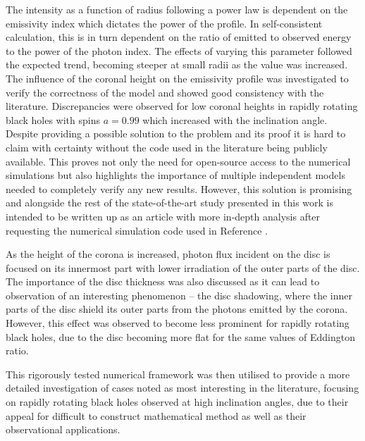 \documentclass[fleqn,usenatbib,useAMS]{mnras}
\begin{document}
The intensity as a function of radius following a power law is dependent on the emissivity index which dictates the power of the profile. In self-consistent calculation, this is in turn dependent on the ratio of emitted to observed energy to the power of the photon index. The effects of varying this parameter followed the expected trend, becoming steeper at small radii as the value was increased. The influence of the coronal height on the emissivity profile was investigated to verify the correctness of the model and showed good consistency with the literature. Discrepancies were observed for low coronal heights in rapidly rotating black holes with spins $a = 0.99$ which increased with the inclination angle. Despite providing a possible solution to the problem and its proof it is hard to claim with certainty without the code used in the literature being publicly available. This proves not only the need for open-source access to the numerical simulations but also highlights the importance of multiple independent models needed to completely verify any new results. However, this solution is promising and alongside the rest of the state-of-the-art study presented in this work is intended to be written up as an article with more in-depth analysis after requesting the numerical simulation code used in Reference \cite{taylor2018exploring}.

As the height of the corona is increased, photon flux incident on the disc is focused on its innermost part with lower irradiation of the outer parts of the disc. The importance of the disc thickness was also discussed as it can lead to observation of an interesting phenomenon -- the disc shadowing, where the inner parts of the disc shield its outer parts from the photons emitted by the corona. However, this effect was observed to become less prominent for rapidly rotating black holes, due to the disc becoming more flat for the same values of Eddington ratio.

This rigorously tested numerical framework was then utilised to provide a more detailed investigation of cases noted as most interesting in the literature, focusing on rapidly rotating black holes observed at high inclination angles, due to their appeal for difficult to construct mathematical method as well as their observational applications.
\end{document}
